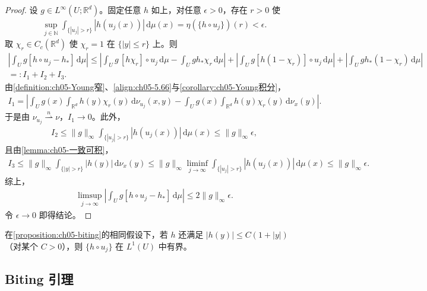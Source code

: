 \documentclass[../../main.tex]{subfiles}%
\begin{document}
\begin{proof}
设 $g\in L^\infty(U;\mathbb{R}^d)$。固定任意 $h$ 如上，对任意 $\epsilon>0$，存在 $r>0$ 使
\begin{align*}
\sup_{j\in\mathbb{N}}\int_{\{|u_j|>r\}}|h(u_j(x))|\,\mathrm{d}\mu(x)
=\eta(\{h\circ u_j\})(r)<\epsilon.
\end{align*}
取 $\chi_r\in C_c(\mathbb{R}^d)$ 使 $\chi_r=1$ 在 $\{|y|\leqslant r\}$ 上。则
\begin{align*}
\left|\int_U g[h\circ u_j-h_*]\,\mathrm{d}\mu\right|
\leqslant\left|\int_U g\,[h\chi_r]\circ u_j\,\mathrm{d}\mu-\int_U g h_*\chi_r\,\mathrm{d}\mu\right|
+\left|\int_U g[h(1-\chi_r)]\circ u_j\,\mathrm{d}\mu\right|
+\left|\int_U g h_*(1-\chi_r)\,\mathrm{d}\mu\right|\\
=:I_1+I_2+I_3.
\end{align*}
由\cref{definition:ch05-Young窄}、\eqref{align:ch05-5.66}与\cref{corollary:ch05-Young积分}，
\begin{align*}
I_1=\left|\int_U g(x)\int_{\mathbb{R}^d}h(y)\chi_r(y)\,\mathrm{d}\nu_{u_j}(x,y)
-\int_U g(x)\int_{\mathbb{R}^d}h(y)\chi_r(y)\,\mathrm{d}\nu_x(y)\right|.
\end{align*}
于是由 $\nu_{u_j}\stackrel{n}{\rightharpoonup}\nu$，$I_1\to0$。此外，
\begin{align*}
I_2\leqslant\|g\|_\infty\int_{\{|u_j|>r\}}|h(u_j(x))|\,\mathrm{d}\mu(x)
\leqslant\|g\|_\infty\epsilon,
\end{align*}
且由\cref{lemma:ch05-一致可积}，
\begin{align*}
I_3\leqslant\|g\|_\infty\int_{\{|y|>r\}}|h(y)|\,\mathrm{d}\nu_x(y)
\leqslant\|g\|_\infty\liminf_{j\to\infty}\int_{\{|u_j|>r\}}|h(u_j(x))|\,\mathrm{d}\mu(x)
\leqslant\|g\|_\infty\epsilon.
\end{align*}
综上，
\begin{align*}
\limsup_{j\to\infty}\left|\int_U g[h\circ u_j-h_*]\,\mathrm{d}\mu\right|
\leqslant2\|g\|_\infty\epsilon.
\end{align*}
令 $\epsilon\to0$ 即得结论。
\end{proof}

\begin{remark}\label{remark:ch05-biting注}
\label{remark:ch05-5.4.4}
在\cref{proposition:ch05-biting}的相同假设下，若 $h$ 还满足 $|h(y)|\leqslant C(1+|y|)$（对某个 $C>0$），则 $\{h\circ u_j\}$ 在 $L^1(U)$ 中有界。
\end{remark}

\subsection{Biting 引理}\label{subsection:ch05-Biting}
\end{document}
